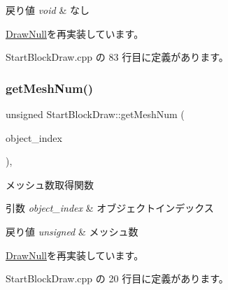 \begin{DoxyRetVals}{戻り値}
{\em void} & なし \\
\hline
\end{DoxyRetVals}


\mbox{\hyperlink{class_draw_null_a72ac0b7dc40b1469582419dcc5b0e114}{Draw\+Null}}を再実装しています。



 Start\+Block\+Draw.\+cpp の 83 行目に定義があります。

\mbox{\label{class_start_block_draw_a15cefedde4eab371fa2229d86c54455d}} 
\subsubsection{\texorpdfstring{get\+Mesh\+Num()}{getMeshNum()}}
{\footnotesize\ttfamily unsigned Start\+Block\+Draw\+::get\+Mesh\+Num (\begin{DoxyParamCaption}\item[{unsigned}]{object\+\_\+index }\end{DoxyParamCaption})\hspace{0.3cm}{\ttfamily [override]}, {\ttfamily [virtual]}}



メッシュ数取得関数 


\begin{DoxyParams}{引数}
{\em object\+\_\+index} & オブジェクトインデックス \\
\hline
\end{DoxyParams}

\begin{DoxyRetVals}{戻り値}
{\em unsigned} & メッシュ数 \\
\hline
\end{DoxyRetVals}


\mbox{\hyperlink{class_draw_null_a4c566a37d27fac3dcf76c7970443f375}{Draw\+Null}}を再実装しています。



 Start\+Block\+Draw.\+cpp の 20 行目に定義があります。

\mbox{\label{class_start_block_draw_a42d2c4f04609ba09359470fc38113bbf}} 
